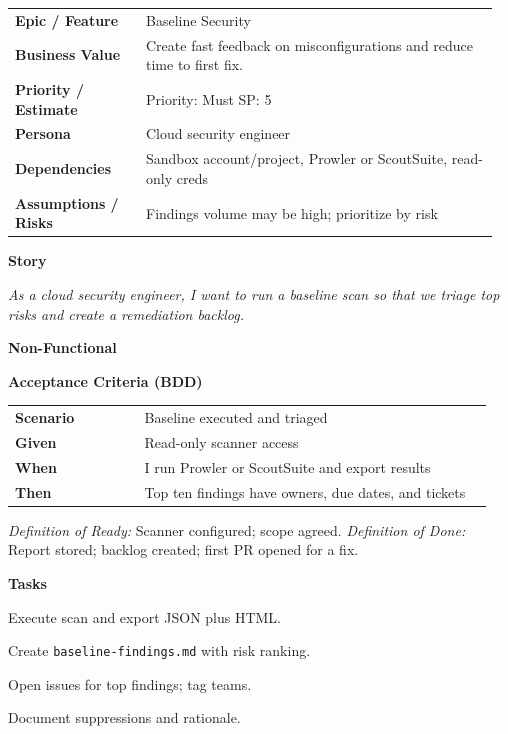 \documentclass[11pt,letterpaper]{article}
\makeatletter
\newenvironment{kvtable}{%
  \par\noindent\begin{tabular}{@{}>{\raggedright\bfseries\arraybackslash}p{0.26\linewidth} >{\raggedright\arraybackslash}p{0.70\linewidth}@{}}
}{\end{tabular}\par}
\newenvironment{bdd}{%
  \par\noindent\begin{tabular}{@{}>{\raggedright\bfseries\arraybackslash}p{0.26\linewidth} >{\raggedright\arraybackslash}p{0.70\linewidth}@{}}
}{\end{tabular}\par}
\newcommand{\DoRDoD}[2]{%
  \vspace{0.35em}
  {\footnotesize\color{Muted}%
    \textit{Definition of Ready:} #1 \; \textbullet\;
    \textit{Definition of Done:} #2%
  }%
}
\newenvironment{storycard}[2]{%
  \begin{tcolorbox}[cloudcard, title={#1 --- #2}]%
}{\end{tcolorbox}}
\newcommand{\sectionlabel}[1]{\par\vspace{0.35em}\textbf{#1}\par}
\makeatother
\begin{document}
\begin{storycard}{CCS-3}{Ch. 3 — Security Baselines}
\begin{kvtable}
Epic / Feature & Baseline Security\\
Business Value & Create fast feedback on misconfigurations and reduce time to first fix.\\
Priority / Estimate & Priority: Must \quad SP: 5\\
Persona & Cloud security engineer\\
Dependencies & Sandbox account/project, Prowler or ScoutSuite, read-only creds\\
Assumptions / Risks & Findings volume may be high; prioritize by risk\\
\end{kvtable}
\sectionlabel{Story}
\textit{As a cloud security engineer, I want to run a baseline scan so that we triage top risks and create a remediation backlog.}
\sectionlabel{Non-Functional}\;\;
\sectionlabel{Acceptance Criteria (BDD)}
\begin{bdd}
Scenario & Baseline executed and triaged\\
Given & Read-only scanner access\\
When & I run Prowler or ScoutSuite and export results\\
Then & Top ten findings have owners, due dates, and tickets\\
\end{bdd}
\DoRDoD{Scanner configured; scope agreed.}{Report stored; backlog created; first PR opened for a fix.}
\sectionlabel{Tasks}
\begin{checklist}
\item Execute scan and export JSON plus HTML.
\item Create \texttt{baseline-findings.md} with risk ranking.
\item Open issues for top findings; tag teams.
\item Document suppressions and rationale.
\end{checklist}
\end{storycard}
\end{document}
